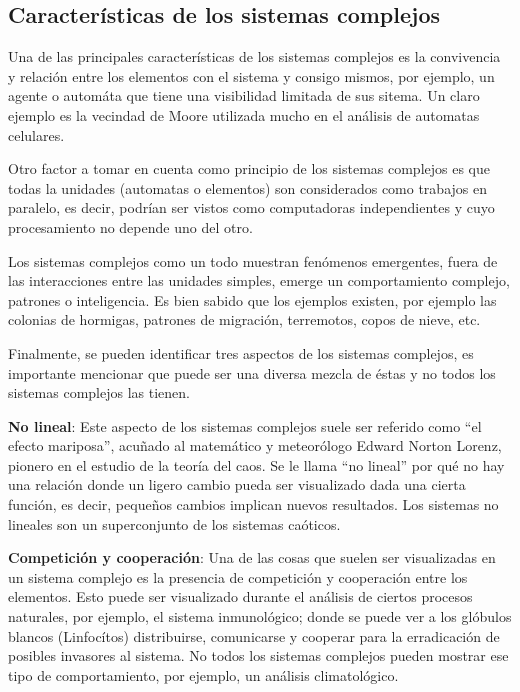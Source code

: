     \subsection{Características de los sistemas complejos}
      Una de las principales características de los sistemas complejos es la convivencia y relación entre los elementos con el sistema y consigo mismos, por ejemplo, un agente o automáta que tiene una visibilidad limitada de sus sitema. Un claro ejemplo es la vecindad de Moore utilizada mucho en el análisis de automatas celulares.\cite{4}
      
      Otro factor a tomar en cuenta como principio de los sistemas complejos es que todas la unidades (automatas o elementos) son considerados como trabajos en paralelo, es decir, podrían ser vistos como computadoras independientes y cuyo procesamiento no depende uno del otro.

      Los sistemas complejos como un todo muestran fenómenos emergentes, fuera de las interacciones entre las unidades simples, emerge un comportamiento complejo, patrones o inteligencia. Es bien sabido que los ejemplos existen, por ejemplo las colonias de hormigas, patrones de migración, terremotos, copos de nieve, etc.

      Finalmente, se pueden identificar tres aspectos de los sistemas complejos, es importante mencionar que puede ser una diversa mezcla de éstas y no todos los sistemas complejos las tienen.

      \textbf{No lineal}: Este aspecto de los sistemas complejos suele ser referido como ``el efecto mariposa'', acuñado al matemático y meteorólogo Edward Norton Lorenz, pionero en el estudio de la teoría del caos. Se le llama ``no lineal'' por qué no hay una relación donde un ligero cambio pueda ser visualizado dada una cierta función, es decir, pequeños cambios implican nuevos resultados. Los sistemas no lineales son un superconjunto de los sistemas caóticos.

      \textbf{Competición y cooperación}: Una de las cosas que suelen ser visualizadas en un sistema complejo es la presencia de competición y cooperación entre los elementos. Esto puede ser visualizado durante el análisis de ciertos procesos naturales, por ejemplo, el sistema inmunológico; donde se puede ver a los glóbulos blancos (Linfocítos) distribuirse, comunicarse y cooperar para la erradicación de posibles invasores al sistema. No todos los sistemas complejos pueden mostrar ese tipo de comportamiento, por ejemplo, un análisis climatológico.

